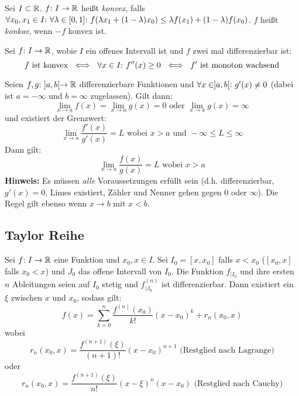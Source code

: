 \begin{frameddefn}
	Sei $I \subset \mathbb{R}$. $f{:}\  I \to \mathbb{R}$ heißt \textit{konvex}, falls $\forall x_0, x_1 \in I{:}\  \forall \lambda \in [0,1]{:}\  f(\lambda x_1 + (1-\lambda) x_0) \leq \lambda f(x_1) + (1-\lambda) f(x_0)$. $f$ heißt \textit{konkav}, wenn $-f$ konvex ist.
\end{frameddefn}

\begin{framedthm}
	Sei $f{:}\  I \to \mathbb{R}$, wobie $I$ ein offenes Intervall ist und $f$ zwei mal differenzierbar ist:
	\[
	f \textrm{ ist konvex } \iff\  \forall x \in I{:}\  f''(x) \geq 0 \ \iff\ f' \textrm{ ist monoton wachsend}
	\]
\end{framedthm}

\begin{framedthm}
	Seien $f,g {:}\  ]a,b[ \to \mathbb{R}$ differenzierbare Funktionen und $\forall x \in ]a,b[{:}\  g'(x) \neq 0$ (dabei ist $a=-\infty$ und $b=\infty$ zugelassen). Gilt dann:
	\[
	\lim\limits_{x \to a} f(x) = \lim\limits_{x \to a} g(x) = 0 \textrm{ oder } \lim\limits_{x \to a} g(x) = \infty
	\]
	und existiert der Grenzwert:
	\[
	\lim\limits_{x \to a} \frac{f'(x)}{g'(x)} = L \textrm{ wobei } x > a \textrm{ und } -\infty\leq L \leq \infty
	\]
	Dann gilt:
	\[
	\lim\limits_{x \to a} \frac{f(x)}{g(x)} = L \textrm{ wobei } x > a
	\]
	\textbf{Hinweis:} Es müssen \textit{alle} Voraussetzungen erfüllt sein (d.h. differenzierbar, $g'(x) = 0$, Limes existiert, Zähler und Nenner gehen gegen $0$ oder $\infty$). Die Regel gilt ebenso wenn $x \to b$ mit $x < b$.
\end{framedthm}

\newpage
\subsection{Taylor Reihe}

\begin{framedthm}
	Sei $f{:}\  I \to \mathbb{R}$ eine Funktion und $x_0, x \in I$. Sei $I_0 = [x, x_0]$ falls $x < x_0$ ($[x_0, x]$ falls $x_0 < x$) und $J_0$ das offene Intervall von $I_0$. Die Funktion $f_{|I_{0}}$ und ihre ersten $n$ Ableitungen seien auf $I_0$ stetig und $f^{(n)}_{|J_{0}}$ ist differenzierbar. Dann existiert ein $\xi$ zwischen $x$ und $x_0$, sodass gilt:
	\[
	f(x) = \sum^{n}_{k=0} \frac{f^{(n)}(x_0)}{k!} (x-x_0)^k + r_n(x_0, x)
	\]
	wobei
	\[
	r_n(x_0,x) = \frac{f^{(n+1)}(\xi)}{(n+1)!} (x-x_0)^{n+1} \textrm{ (Restglied nach Lagrange)}
	\]
	oder
	\[
	r_n(x_0,x) = \frac{f^{(n+1)}(\xi)}{n!} (x-\xi)^{n} (x-x_0) \textrm{ (Restglied nach Cauchy)}
	\]
\end{framedthm}

